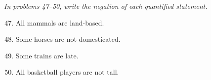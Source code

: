 \emph{In problems 47--50, write the negation of each quantified statement.}
\begin{enumerate}
\setcounter{enumi}{46}

\item All mammals are land-based. 

\item Some horses are not domesticated. 

\item Some trains are late. 

\item All basketball players are not tall. 
\end{enumerate}